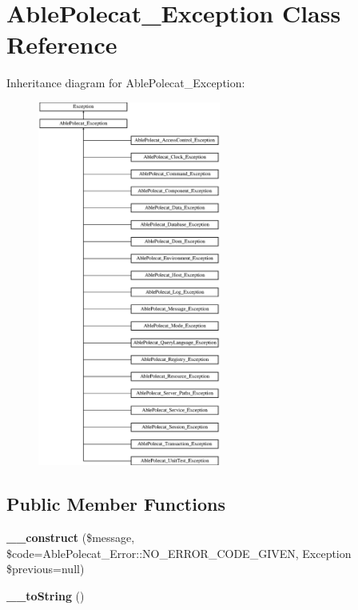 \hypertarget{class_able_polecat___exception}{}\section{Able\+Polecat\+\_\+\+Exception Class Reference}
\label{class_able_polecat___exception}
Inheritance diagram for Able\+Polecat\+\_\+\+Exception\+:\begin{figure}[H]
\begin{center}
\leavevmode
\includegraphics[height=12.000000cm]{class_able_polecat___exception}
\end{center}
\end{figure}
\subsection*{Public Member Functions}
\begin{DoxyCompactItemize}
\item 
\hypertarget{class_able_polecat___exception_a9985b01b3d73f50acf4b39fb7cce1a69}{}{\bfseries \+\_\+\+\_\+construct} (\$message, \$code=Able\+Polecat\+\_\+\+Error\+::\+N\+O\+\_\+\+E\+R\+R\+O\+R\+\_\+\+C\+O\+D\+E\+\_\+\+G\+I\+V\+E\+N, Exception \$previous=null)\label{class_able_polecat___exception_a9985b01b3d73f50acf4b39fb7cce1a69}

\item 
\hypertarget{class_able_polecat___exception_a7516ca30af0db3cdbf9a7739b48ce91d}{}{\bfseries \+\_\+\+\_\+to\+String} ()\label{class_able_polecat___exception_a7516ca30af0db3cdbf9a7739b48ce91d}

\end{DoxyCompactItemize}
